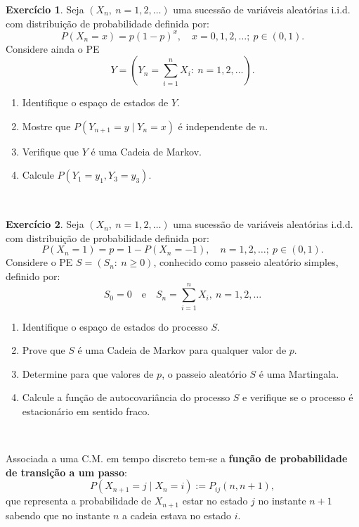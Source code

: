 \documentclass[
  11pt,
  a4paper,
]{book}
\theoremstyle{definition}
\theoremstyle{definition}
\theoremstyle{definition}
\newtheorem{exercise}{Exercício}[chapter]
\theoremstyle{definition}
\theoremstyle{remark}
\begin{document}
\begin{exercise}

Seja \((X_n, ~n=1,2,\dots)\) uma sucessão de variáveis aleatórias i.i.d. com distribuição de probabilidade definida por:
\[P(X_n=x)=p(1-p)^x, \quad x=0,1,2,\dots; ~ p \in (0,1).\]
Considere ainda o PE
\[Y=(Y_n=\sum\limits_{i=1}^{n}X_i: ~n=1,2,\dots).\]

\begin{enumerate}
\def\labelenumi{(\alph{enumi})}
\item
  Identifique o espaço de estados de \(Y\).
\item
  Mostre que \(P(Y_{n+1}=y \mid Y_n=x)\) é independente de \(n\).
\item
  Verifique que \(Y\) é uma Cadeia de Markov.
\item
  Calcule \(P(Y_1=y_1, Y_3=y_3)\).
\end{enumerate}

\end{exercise}

\(\,\)

\begin{exercise}

Seja \((X_n, ~n=1,2,\dots)\) uma sucessão de variáveis aleatórias i.d.d. com distribuição de probabilidade definida por:
\[P(X_n=1)=p=1-P(X_n=-1), \quad n=1,2,\dots; ~p \in (0,1).\]
Considere o PE \(S=(S_n: ~n\geq 0)\), conhecido como passeio aleatório simples, definido por:
\[S_0=0 \quad \text{e} \quad S_n=\sum\limits_{i=1}^{n}X_i, ~n=1,2,\dots\]

\begin{enumerate}
\def\labelenumi{(\alph{enumi})}
\item
  Identifique o espaço de estados do processo \(S\).
\item
  Prove que \(S\) é uma Cadeia de Markov para qualquer valor de \(p\).
\item
  Determine para que valores de \(p\), o passeio aleatório \(S\) é uma Martingala.
\item
  Calcule a função de autocovariância do processo \(S\) e verifique se o processo é estacionário em sentido fraco.
\end{enumerate}

\end{exercise}

\(\,\)

Associada a uma C.M. em tempo discreto tem-se a \textbf{função de probabilidade de transição a um passo}:
\[P(X_{n+1}=j \mid X_n=i):=P_{ij}(n,n+1),\]
que representa a probabilidade de \(X_{n+1}\) estar no estado \(j\) no instante \(n+1\) sabendo que no instante \(n\) a cadeia estava no estado \(i\).
\end{document}
